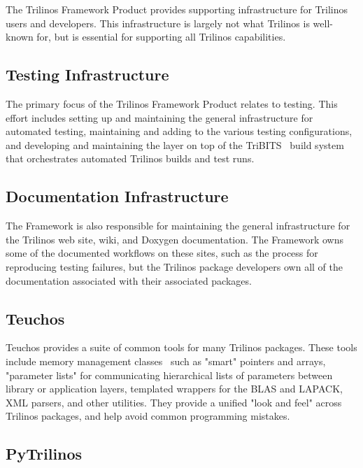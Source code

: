 
The Trilinos Framework Product provides supporting infrastructure for Trilinos users and developers. This infrastructure is largely not what Trilinos is well-known for, but is essential for supporting all Trilinos capabilities.

\subsection{Testing Infrastructure}

The primary focus of the Trilinos Framework Product relates to testing. This effort includes setting up and maintaining the general infrastructure for automated testing, maintaining and adding to the various testing configurations, and developing and maintaining the layer on top of the TriBITS~\cite{Bartlett2014} build system that orchestrates automated Trilinos builds and test runs.

\subsection{Documentation Infrastructure}

The Framework is also responsible for maintaining the general infrastructure for the Trilinos web site, wiki, and Doxygen documentation. The Framework owns some of the documented workflows on these sites, such as the process for reproducing testing failures, but the Trilinos package developers own all of the documentation associated with their associated packages.

\subsection{Teuchos}

Teuchos provides a suite of common tools for many Trilinos packages. These tools include memory management classes~\cite{bartlett2010} such as "smart" pointers and arrays, "parameter lists" for communicating hierarchical lists of parameters between library or application layers, templated wrappers for the BLAS and LAPACK, XML parsers, and other utilities. They provide a unified "look and feel" across Trilinos packages, and help avoid common programming mistakes.

\subsection{PyTrilinos}


